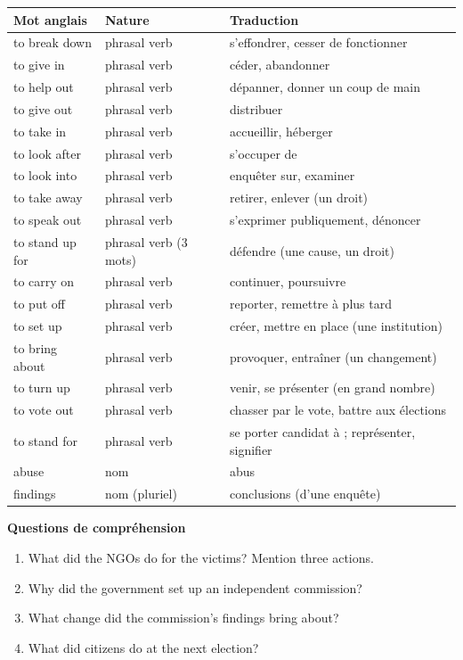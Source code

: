 \documentclass[11pt]{article}
\begin{document}
\begin{center}
\begin{tabularx}{\linewidth}{|l|l|X|}
\hline
\rowcolor{popblueL} \textbf{Mot anglais} & \textbf{Nature} & \textbf{Traduction} \\
\hline
to break down & phrasal verb & s'effondrer, cesser de fonctionner \\
\hline
to give in & phrasal verb & céder, abandonner \\
\hline
to help out & phrasal verb & dépanner, donner un coup de main \\
\hline
to give out & phrasal verb & distribuer \\
\hline
to take in & phrasal verb & accueillir, héberger \\
\hline
to look after & phrasal verb & s'occuper de \\
\hline
to look into & phrasal verb & enquêter sur, examiner \\
\hline
to take away & phrasal verb & retirer, enlever (un droit) \\
\hline
to speak out & phrasal verb & s'exprimer publiquement, dénoncer \\
\hline
to stand up for & phrasal verb (3 mots) & défendre (une cause, un droit) \\
\hline
to carry on & phrasal verb & continuer, poursuivre \\
\hline
to put off & phrasal verb & reporter, remettre à plus tard \\
\hline
to set up & phrasal verb & créer, mettre en place (une institution) \\
\hline
to bring about & phrasal verb & provoquer, entraîner (un changement) \\
\hline
to turn up & phrasal verb & venir, se présenter (en grand nombre) \\
\hline
to vote out & phrasal verb & chasser par le vote, battre aux élections \\
\hline
to stand for & phrasal verb & se porter candidat à ; représenter, signifier \\
\hline
abuse & nom & abus \\
\hline
findings & nom (pluriel) & conclusions (d'une enquête) \\
\hline
\end{tabularx}
\end{center}

\textbf{Questions de compréhension}
\begin{enumerate}
\item What did the NGOs do for the victims? Mention three actions.
\item Why did the government set up an independent commission?
\item What change did the commission's findings bring about?
\item What did citizens do at the next election?
\end{enumerate}
\end{document}
